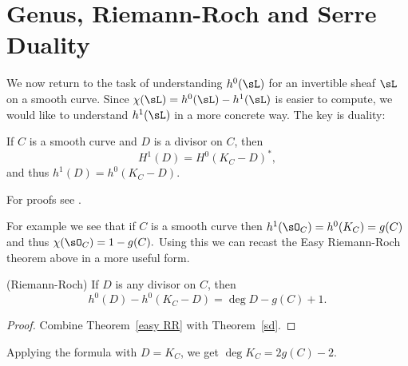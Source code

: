 \section{Genus, Riemann-Roch and Serre Duality}

We now return to the task of understanding $h^0(\sL)$ for an invertible sheaf $\sL$ on a smooth curve. Since $\chi(\sL) = h^0(\sL)-h^1(\sL)$ is easier to compute, we would like to understand $h^1(\sL)$ in a more concrete way. The key is duality:


%
%
%
%
% 
 
\begin{theorem}\label{sd}
If $C$ is a smooth curve and $D$ is a divisor on $C$, then
$$
H^1(D) =H^0(K_C-D)^*,
$$
and thus $h^1(D) = h^0(K_C-D)$.
\end{theorem}

For proofs see \cite[Theorem III.5.2 and III.7.6]{H}. 

For example we see that if $C$ is a smooth curve then $h^1 (\sO_C) = h^0(K_C) = g(C)$ and thus $\chi(\sO_C) = 1-g(C).$   
Using this we can recast the Easy Riemann-Roch theorem above in a more useful form. 

\begin{theorem} (Riemann-Roch)\label{RR theorem}
If $D$ is any divisor on $C$, then 
$$
h^0(D) - h^0(K_C -D) = \deg D - g(C) +1.
$$
\end{theorem}

\begin{proof}
Combine Theorem~\ref{easy RR} with Theorem~\ref{sd}.
\end{proof}
Applying the formula with $D = K_C$, we get 
$\deg K_C = 2g(C) -2$.

